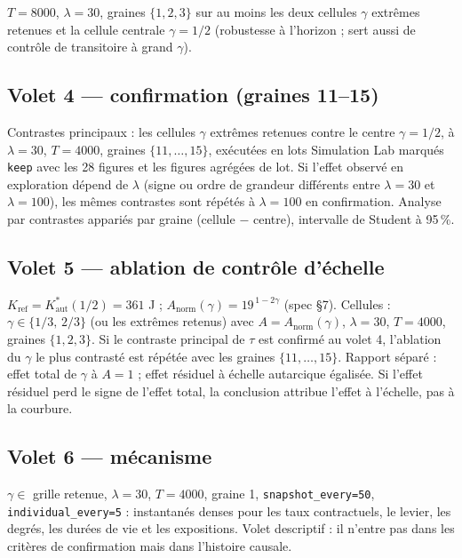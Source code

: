 \documentclass[11pt,a4paper]{article}
\newcommand{\code}[1]{\texttt{#1}}
\newcommand{\Kaut}{K^{*}_{\mathrm{aut}}}
\begin{document}
$T=8000$, $\lambda=30$, graines $\{1,2,3\}$ sur au moins les deux cellules
$\gamma$ extrêmes retenues et la cellule centrale $\gamma=1/2$ (robustesse
à l'horizon ; sert aussi de contrôle de transitoire à grand $\gamma$).

\subsection{Volet 4 --- confirmation (graines 11--15)}

Contrastes principaux : les cellules $\gamma$ extrêmes retenues contre le
centre $\gamma=1/2$, à $\lambda=30$, $T=4000$, graines $\{11,\dots,15\}$,
exécutées en lots Simulation Lab marqués \code{keep} avec les 28 figures
et les figures agrégées de lot. Si l'effet observé en exploration dépend
de $\lambda$ (signe ou ordre de grandeur différents entre $\lambda=30$ et
$\lambda=100$), les mêmes contrastes sont répétés à $\lambda=100$ en
confirmation. Analyse par contrastes appariés par graine
(cellule $-$ centre), intervalle de Student à 95\,\%.

\subsection{Volet 5 --- ablation de contrôle d'échelle}
\label{sec:ablation}

$K_{\mathrm{ref}}=\Kaut(1/2)=361$ J ;
$A_{\mathrm{norm}}(\gamma)=19^{\,1-2\gamma}$ (spec §7). Cellules :
$\gamma\in\{1/3,\,2/3\}$ (ou les extrêmes retenus) avec
$A=A_{\mathrm{norm}}(\gamma)$, $\lambda=30$, $T=4000$, graines $\{1,2,3\}$.
Si le contraste principal de $\tau$ est confirmé au volet 4, l'ablation du
$\gamma$ le plus contrasté est répétée avec les graines $\{11,\dots,15\}$.
Rapport séparé : effet total de $\gamma$ à $A=1$ ; effet résiduel à
échelle autarcique égalisée. Si l'effet résiduel perd le signe de l'effet
total, la conclusion attribue l'effet à l'échelle, pas à la courbure.

\subsection{Volet 6 --- mécanisme}

$\gamma\in$ grille retenue, $\lambda=30$, $T=4000$, graine 1,
\code{snapshot\_every=50}, \code{individual\_every=5} : instantanés denses
pour les taux contractuels, le levier, les degrés, les durées de vie et
les expositions. Volet descriptif : il n'entre pas dans les critères de
confirmation mais dans l'histoire causale.
\end{document}
